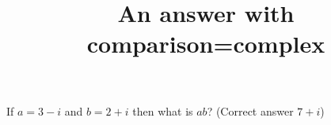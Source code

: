\documentclass[hidesidemenu]{webquiztex}
\title{An answer with comparison=complex}
\begin{document}
  \begin{question}     %
     If $a=3-i$ and $b=2+i$ then what is $ab$?
      (Correct answer $7+i$)
  \end{question}
\end{document}
